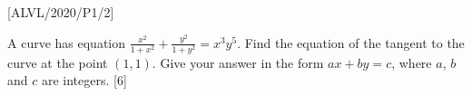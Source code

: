 \item {[}ALVL/2020/P1/2{]}

A curve has equation $\frac{x^{2}}{1+x^{2}}+\frac{y^{2}}{1+y^{2}}=x^{3}y^{5}$.
Find the equation of the tangent to the curve at the point $\left(1,1\right)$.
Give your answer in the form $ax+by=c$, where $a$, $b$ and $c$
are integers. \hfill{}{[}6{]}
